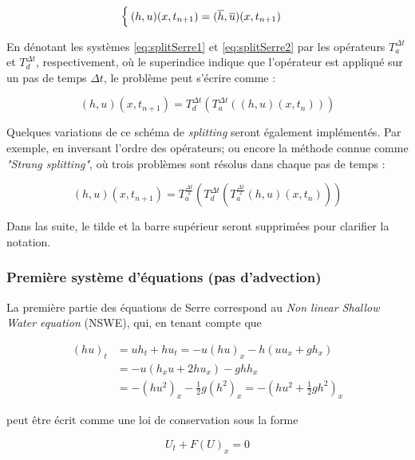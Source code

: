 \begin{equation*}
\begin{cases}
(h,u)(x,t_{n+1}) = (\overline{h},\overline{u})(x,t_{n+1})
\end{cases}
\end{equation*}

\indent En dénotant les systèmes \eqref{eq:splitSerre1} et  \eqref{eq:splitSerre2} par les opérateurs $T_a^{\Delta t}$ et $T_d^{\Delta t}$, respectivement, où le superindice indique que l'opérateur est appliqué sur un pas de temps  $\Delta t$, le problème peut s'écrire comme :

\begin{equation*}
(h,u)(x,t_{n+1}) = T_d^{\Delta t} \left( T_a^{\Delta t} \left((h,u)(x,t_n) \right) \right)
\end{equation*}

\indent Quelques variations de ce schéma de \emph{splitting} seront également implémentés. Par exemple, en inversant l'ordre des opérateurs; ou encore la méthode connue comme \emph{"Strang splitting"}, où trois problèmes sont résolus dans chaque pas de temps :

\begin{equation*}
(h,u)(x,t_{n+1}) = T_a^{\frac{\Delta t}{2}} \left( T_d^{\Delta t} \left( T_a^{\frac{\Delta t}{2}} (h,u)(x,t_n) \right) \right)
\end{equation*}

\indent Dans las suite, le tilde et la barre supérieur seront supprimées pour clarifier la notation.

\subsubsection{Première système d'équations (pas d'advection)}

\indent La première partie des équations de Serre correspond au \emph{Non linear Shallow Water equation} (NSWE), qui, en tenant compte que

\begin{align*}
(hu)_t &= uh_t + hu_t = -u(hu)_x - h\left(uu_x + gh_x\right) \\
	&= -u\left (h_xu + 2hu_x \right) - ghh_x  \\
	&= -\left(hu^2\right)_x - \frac{1}{2}g\left(h^2\right)_x = - \left(hu^2 +  \frac{1}{2}gh^2 \right)_x
\end{align*}

\noindent peut être écrit comme une loi de conservation sous la forme

\begin{equation}
	U_t + F(U)_x = 0
	\label{serre:conservative_swe}
\end{equation}

